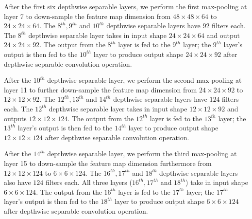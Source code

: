 \documentclass[master]{thesis-uestc}
\begin{document}
After the first six depthwise separable layers, we perform the first max-pooling at layer 7 to down-sample the feature map dimension from $48 \times 48 \times 64$ to $24 \times 24 \times 64$. The $8^{th}, 9^{th}$ and $10^{th}$ depthwise separable layers have $92$ filters each. The $8^{th}$ depthwise separable layer takes in input shape $24 \times 24 \times 64$ and output $24 \times 24 \times 92$. The output from the $8^{th}$ layer is fed to the $9^{th}$ layer; the $9^{th}$ layer's output is then fed to the $10^{th}$ layer to produce output shape $24 \times 24 \times 92$ after depthwise separable convolution operation.

After the $10^{th}$ depthwise separable layer, we perform the second max-pooling at layer 11 to further down-sample the feature map dimension from $24 \times 24 \times 92$ to $12 \times 12 \times 92$. The $12^{th}, 13^{th}$ and $14^{th}$ depthwise separable layers have $124$ filters each. The $12^{th}$ depthwise separable layer takes in input shape $12 \times 12 \times 92$ and outputs $12 \times 12 \times 124$. The output from the $12^{th}$ layer is fed to the $13^{th}$ layer; the $13^{th}$ layer's output is then fed to the $14^{th}$ layer to produce output shape $12 \times 12 \times 124$ after depthwise separable convolution operation.

After the $14^{th}$ depthwise separable layer, we perform the third max-pooling at layer 15 to down-sample the feature map dimension furthermore from $12 \times 12 \times 124$ to $6 \times 6 \times 124$. The $16^{th}, 17^{th}$ and $18^{th}$ depthwise separable layers also have $124$ filters each. All three layers ($16^{th}, 17^{th}$ and $18^{th}$) take in input shape $6 \times 6 \times 124$. The output from the $16^{th}$ layer is fed to the $17^{th}$ layer; the $17^{th}$ layer's output is then fed to the $18^{th}$ layer to produce output shape $6 \times 6 \times 124$ after depthwise separable convolution operation.
\end{document}

